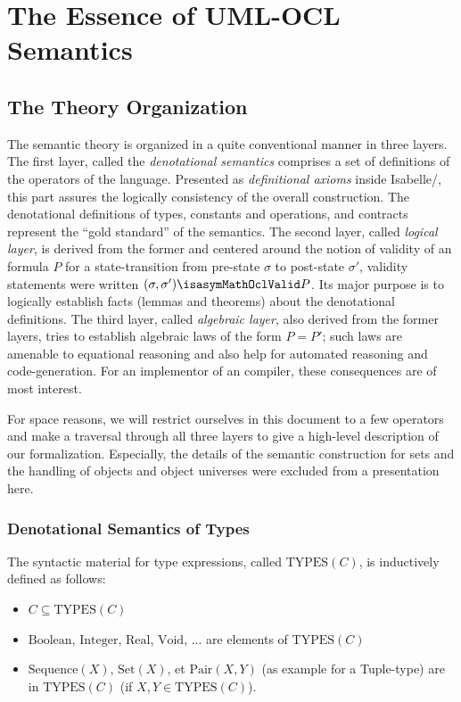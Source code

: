 \section{The Essence of UML-OCL Semantics}
\subsection{The Theory Organization}
The semantic theory is organized in a quite conventional manner in
three layers. The first layer, called the \emph{denotational
  semantics} comprises a set of definitions of the operators of the
language.  Presented as \emph{definitional axioms} inside
Isabelle/\HOL, this part assures the logically consistency of the
overall construction. The denotational definitions of types, constants
and operations, and \OCL contracts represent the ``gold standard'' of the
semantics. The second layer, called \emph{logical layer},
is derived from the former and centered around the notion of validity
of an \OCL formula $P$ for a state-transition from pre-state $\sigma$
to post-state $\sigma'$, validity statements were written $(\sigma,
\sigma') \isasymMathOclValid P$. Its major purpose is to logically establish facts
(lemmas and theorems) about the denotational definitions.
The third layer, called \emph{algebraic layer},
also derived from the former layers, tries to establish algebraic laws
of the form $P = P'$; such laws are amenable to equational reasoning
and also help for automated reasoning and code-generation. For an
implementor of an \OCL compiler, these consequences are of most interest.

For space reasons, we will restrict ourselves in this document to a few
operators and make a traversal through all three layers to give a
high-level description of our formalization.  Especially, the details
of the semantic construction for sets and the handling of objects and
object universes were excluded from a presentation here.

\subsubsection{Denotational Semantics of Types}
The syntactic material for type expressions, called $\text{TYPES}(C)$, is inductively
defined as follows: %
\begin{itemize}
\item $C \subseteq \text{TYPES}(C)$ 
\item $\text{Boolean}$, $\text{Integer}$, $\text{Real}$, $\text{Void}$, ... are elements
      of $\text{TYPES}(C)$
\item $\text{Sequence}(X)$, $\text{Set}(X)$, et $\text{Pair}(X,Y)$ (as example for a Tuple-type)
      are in  $\text{TYPES}(C)$ (if $X, Y \in \text{TYPES}(C)$).
\end{itemize}

